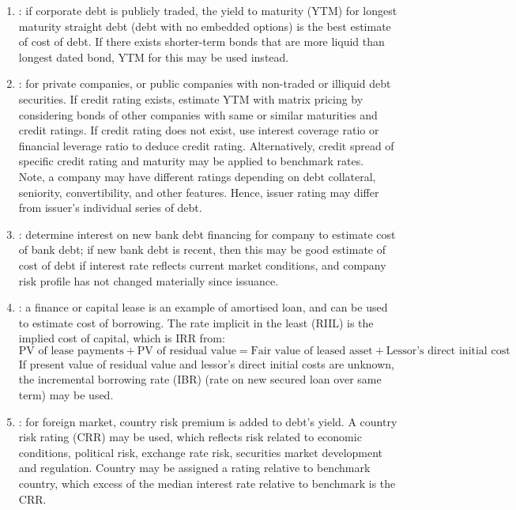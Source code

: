 \begin{method} 
\begin{enumerate}[label=\roman*.]
\setlength{\itemsep}{0pt}
\item {}: if corporate debt is publicly traded, the yield to maturity (YTM) for longest maturity straight debt (debt with no embedded options) is the best estimate of cost of debt. If there exists shorter-term bonds that are more liquid than longest dated bond, YTM for this may be used instead.
\item {}: for private companies, or public companies with non-traded or illiquid debt securities. If credit rating exists, estimate YTM with matrix pricing by considering bonds of other companies with same or similar maturities and credit ratings. If credit rating does not exist, use interest coverage ratio or financial leverage ratio to deduce credit rating. Alternatively, credit spread of specific credit rating and maturity may be applied to benchmark rates.\\
Note, a company may have different ratings depending on debt collateral, seniority, convertibility, and other features. Hence, issuer rating may differ from issuer's individual series of debt.
\item {}: determine interest on new bank debt financing for company to estimate cost of bank debt; if new bank debt is recent, then this may be good estimate of cost of debt if interest rate reflects current market conditions, and company risk profile has not changed materially since issuance.
\item {}: a finance or capital lease is an example of amortised loan, and can be used to estimate cost of borrowing. The rate implicit in the least (RIIL) is the implied cost of capital, which is IRR from:
\begin{equation}
\text{PV of lease payments} + \text{PV of residual value} = \text{Fair value of leased asset} + \text{Lessor's direct initial cost} \nonumber
\end{equation}
If present value of residual value and lessor's direct initial costs are unknown, the incremental borrowing rate (IBR) (rate on new secured loan over same term) may be used.
\item {}: for foreign market, country risk premium is added to debt's yield. A country risk rating (CRR) may be used, which reflects risk related to economic conditions, political risk, exchange rate risk, securities market development and regulation. Country may be assigned a rating relative to benchmark country, which excess of the median interest rate relative to benchmark is the CRR.
\end{enumerate}
\end{method}

